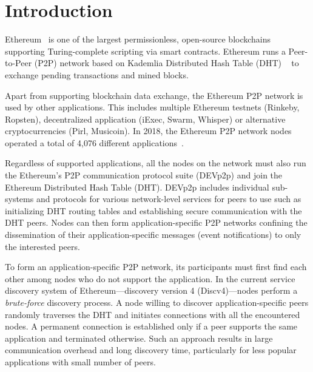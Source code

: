 
\section{Introduction}
 Ethereum~\cite{buterin2013ethereum}  is one of the largest permissionless,  open-source  blockchains supporting Turing-complete scripting via smart contracts. Ethereum runs a Peer-to-Peer (P2P) network based on Kademlia Distributed Hash Table (DHT) ~\cite{maymounkov2002kademlia} to exchange pending transactions and mined blocks. 

Apart from supporting blockchain data exchange, the Ethereum P2P network is used by other applications. This includes multiple Ethereum testnets (Rinkeby, Ropsten), decentralized application (iExec, Swarm, Whisper) or alternative cryptocurrencies (Pirl, Musicoin). In 2018, the Ethereum P2P network nodes operated a total of 4,076 different applications~\cite{kim2018measuring}. 

Regardless of supported applications, all the nodes on the network must also run the Ethereum’s P2P communication protocol suite (DEVp2p) and join the Ethereum Distributed Hash Table (DHT). DEVp2p includes individual sub-systems and protocols for various network-level services for peers to use such as initializing DHT routing tables and establishing secure communication with the DHT peers. Nodes can then form application-specific P2P networks confining the dissemination of their application-specific messages (\eg event notifications) to only the interested peers.



 To form an application-specific P2P network, its participants must first find each other among nodes who do not support the application. In the current service discovery system of Ethereum---\ie discovery version 4 (Discv4)---nodes perform a \textit{brute-force} discovery process. A node willing to discover application-specific peers randomly traverses the DHT and initiates connections with all the encountered nodes. A permanent connection is established only if a peer supports the same application and terminated otherwise. Such an approach results in large communication overhead and long discovery time, particularly for less popular applications with small number of peers.

